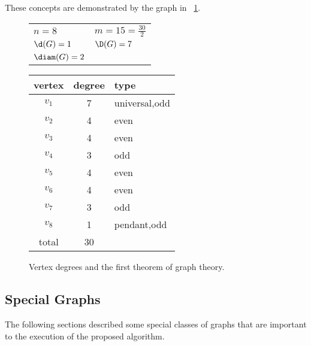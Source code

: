 These concepts are demonstrated by the graph in \figurename~\ref{fig:degree}.

\begin{figure}[H]
  \begin{minipage}{3.25in}
    \centering

    \bigskip

    \begin{tabular}{ll}
      \(n=8\) & \(m=15=\frac{30}{2}\) \\
      \(\d(G)=1\) & \(\D(G)=7\) \\
      \(\diam(G)=2\)
    \end{tabular}
  \end{minipage}
  \begin{minipage}{2.5in}
    \begin{tabular}{c|c|l}
      vertex & degree & type \\
      \hline
      \(v_1\) & 7 & universal,odd \\
      \(v_2\) & 4 & even \\
      \(v_3\) & 4 & even \\
      \(v_4\) & 3 & odd \\
      \(v_5\) & 4 & even \\
      \(v_6\) & 4 & even \\
      \(v_7\) & 3 & odd \\
      \(v_8\) & 1 & pendant,odd \\
      \hline
      total & 30 &
    \end{tabular}
  \end{minipage}
  \caption{Vertex degrees and the first theorem of graph theory.}
  \label{fig:degree}
\end{figure}

\subsection{Special Graphs}\label{sec:sub:special}

The following sections described some special classes of graphs that are important to the execution of the proposed
algorithm.

